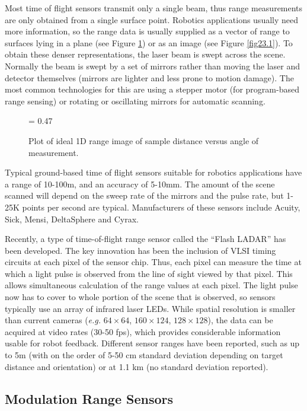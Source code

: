 \documentclass[twocolumn,oneside]{book}
\begin{document}
Most time of flight sensors transmit only a single beam, thus range measurements
are only obtained from a single surface point.
Robotics applications usually need more information, so the range data 
is usually supplied as a vector of range to surfaces lying in a plane
(see Figure \ref{lineing}) or as an image (see Figure \ref{fig23.1}).
To obtain these denser representations, the laser beam is swept across the
scene.
Normally the beam is swept by a set of mirrors rather than moving 
the laser and detector themselves (mirrors are lighter and less prone 
to motion damage).
The most common technologies for this are using a stepper motor (for
program-based range sensing) or rotating or oscillating mirrors for
automatic scanning.
\begin{figure}[htb]
{\epsfxsize = 0.47\textwidth {}}
\caption{Plot of ideal 1D range image of sample distance versus angle of measurement.
\label{lineing}}
\end{figure}

Typical ground-based time of flight sensors suitable for robotics
applications have a range of 10-100m, and an accuracy of 5-10mm.
The amount of the scene scanned will depend on the sweep rate of the 
mirrors and the pulse rate, but 1-25K points per second are typical.
Manufacturers of these sensors include Acuity, Sick, Mensi,
DeltaSphere and Cyrax.

Recently, a type of time-of-flight range sensor called the ``Flash LADAR''
has been developed.
The key innovation has been the inclusion of VLSI timing circuits at each
pixel of the sensor chip.
Thus, each pixel can measure the time at which a light pulse is observed
from the line of sight viewed by that pixel.
This allows simultaneous calculation of the range values at each pixel.
The light pulse now has to cover to whole portion of the scene that is
observed, so sensors typically use an array of infrared laser LEDs.
While spatial resolution is smaller than current cameras ({\it e.g.}
$64\times 64$, $160\times 124$, $128\times 128$), the data can be acquired
at video rates (30-50 fps), which provides considerable information 
usable for robot feedback.
Different sensor ranges have been reported, such as up to 5m \cite{anderson}
(with on the order of 5-50 cm standard deviation depending on
target distance and orientation)
or at 1.1 km \cite{stettner} (no standard deviation reported).

\subsection{Modulation Range Sensors}
\end{document}
